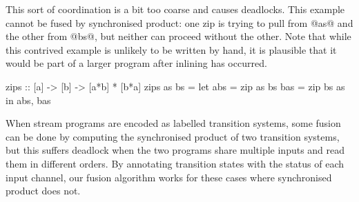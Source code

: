 This sort of coordination is a bit too coarse and causes deadlocks.
This example cannot be fused by synchronised product: one zip is trying to pull from @as@ and the other from @bs@, but neither can proceed without the other.
Note that while this contrived example is unlikely to be written by hand, it is plausible that it would be part of a larger program after inlining has occurred.

\begin{code}
zips :: [a] -> [b] -> [a*b] * [b*a]
zips as bs =
  let abs = zip as bs
      bas = zip bs as
  in  abs, bas
\end{code}

When stream programs are encoded as labelled transition systems, some fusion can be done by computing the synchronised product of two transition systems, but this suffers deadlock when the two programs share multiple inputs and read them in different orders.
By annotating transition states with the status of each input channel, our fusion algorithm works for these cases where synchronised product does not.


